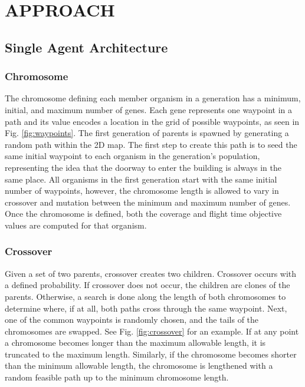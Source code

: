 \documentclass[letterpaper, 10 pt, conference]{ieeeconf}  %
\begin{document}
\section{APPROACH}\label{approach}
\subsection{Single Agent Architecture}

\subsubsection{Chromosome}

The chromosome defining each member organism in a generation has a minimum, initial, and maximum number of genes. Each gene represents one waypoint in a path and its value encodes a location in the grid of possible waypoints, as seen in Fig. \ref{fig:waypoints}. The first generation of parents is spawned by generating a random path within the 2D map. The first step to create this path is to seed the same initial waypoint to each organism in the generation's population, representing the idea that the doorway to enter the building is always in the same place. All organisms in the first generation start with the same initial number of waypoints, however, the chromosome length is allowed to vary in crossover and mutation between the minimum and maximum number of genes. Once the chromosome is defined, both the coverage and flight time objective values are computed for that organism.

\subsubsection{Crossover}

Given a set of two parents, crossover creates two children. Crossover occurs with a defined probability. If crossover does not occur, the children are clones of the parents. Otherwise, a search is done along the length of both chromosomes to determine where, if at all, both paths cross through the same waypoint. Next, one of the common waypoints is randomly chosen, and the tails of the chromosomes are swapped. See Fig. \ref{fig:crossover} for an example. If at any point a chromosome becomes longer than the maximum allowable length, it is truncated to the maximum length. Similarly, if the chromosome becomes shorter than the minimum allowable length, the chromosome is lengthened with a random feasible path up to the minimum chromosome length.
\end{document}

